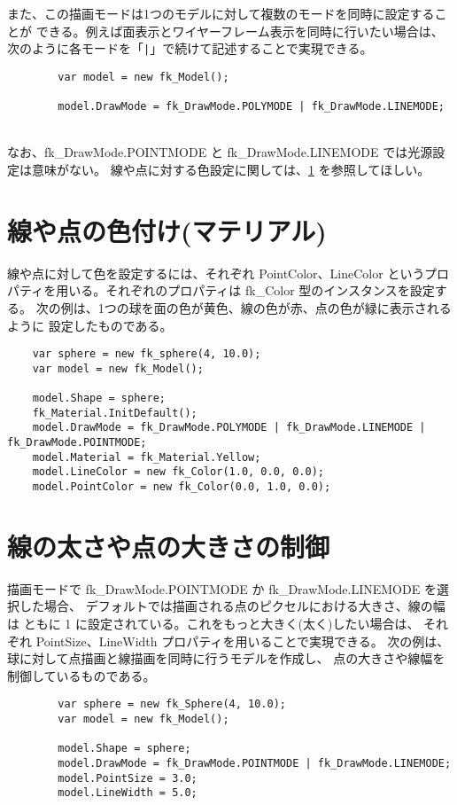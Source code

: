 また、この描画モードは1つのモデルに対して複数のモードを同時に設定することが
できる。例えば面表示とワイヤーフレーム表示を同時に行いたい場合は、
次のように各モードを「\verb+|+」で続けて記述することで実現できる。
\\
\begin{breakbox}
\begin{verbatim}
        var model = new fk_Model();

        model.DrawMode = fk_DrawMode.POLYMODE | fk_DrawMode.LINEMODE;
\end{verbatim}
\end{breakbox}
~ \\
なお、fk\_DrawMode.POINTMODE と fk\_DrawMode.LINEMODE では光源設定は意味がない。
線や点に対する色設定に関しては、\ref{sec:pointlinemat} を参照してほしい。

\section{線や点の色付け(マテリアル)} \label{sec:pointlinemat}
線や点に対して色を設定するには、それぞれ PointColor、LineColor
というプロパティを用いる。それぞれのプロパティは fk\_Color 型のインスタンスを設定する。
次の例は、1つの球を面の色が黄色、線の色が赤、点の色が緑に表示されるように
設定したものである。
\\
\begin{breakbox}
\begin{verbatim}
    var sphere = new fk_sphere(4, 10.0);
    var model = new fk_Model();
    
    model.Shape = sphere;
    fk_Material.InitDefault();
    model.DrawMode = fk_DrawMode.POLYMODE | fk_DrawMode.LINEMODE | fk_DrawMode.POINTMODE;
    model.Material = fk_Material.Yellow;
    model.LineColor = new fk_Color(1.0, 0.0, 0.0);
    model.PointColor = new fk_Color(0.0, 1.0, 0.0);
\end{verbatim}
\end{breakbox}

\section{線の太さや点の大きさの制御} \label{sec:widthsize}
描画モードで fk\_DrawMode.POINTMODE か fk\_DrawMode.LINEMODE を選択した場合、
デフォルトでは描画される点のピクセルにおける大きさ、線の幅は
ともに 1 に設定されている。これをもっと大きく(太く)したい場合は、
それぞれ PointSize、LineWidth プロパティを用いることで実現できる。
次の例は、球に対して点描画と線描画を同時に行うモデルを作成し、
点の大きさや線幅を制御しているものである。
\\
\begin{breakbox}
\begin{verbatim}
        var sphere = new fk_Sphere(4, 10.0);
        var model = new fk_Model();

        model.Shape = sphere;
        model.DrawMode = fk_DrawMode.POINTMODE | fk_DrawMode.LINEMODE;
        model.PointSize = 3.0;
        model.LineWidth = 5.0;
\end{verbatim}
\end{breakbox}

